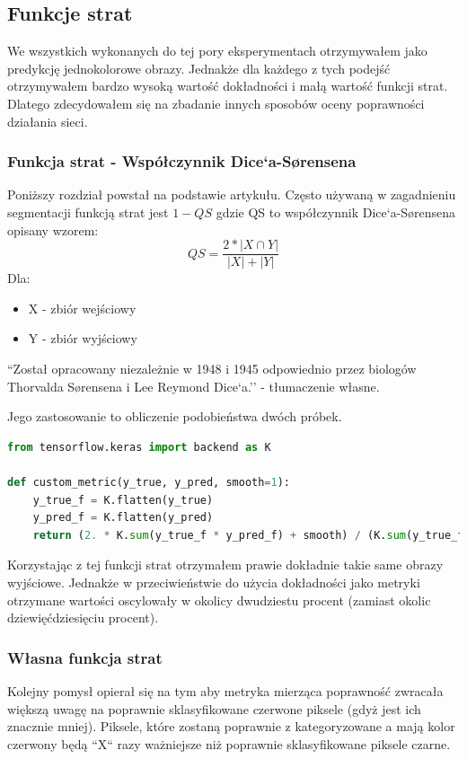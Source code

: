\documentclass{article}
\begin{document}
\subsection{Funkcje strat}
We wszystkich wykonanych do tej pory eksperymentach otrzymywałem jako predykcję jednokolorowe obrazy.
Jednakże dla każdego z tych podejść otrzymywałem bardzo wysoką wartość dokładności i małą wartość funkcji strat.
Dlatego zdecydowałem się na zbadanie innych sposobów oceny poprawności działania sieci.
\subsubsection{Funkcja strat - Współczynnik Dice`a-Sørensena}
Poniższy rozdział powstał na podstawie artykułu\cite{coefficient}.
Często używaną w zagadnieniu segmentacji funkcją strat jest $1-QS$ gdzie QS to współczynnik Dice`a-Sørensena opisany wzorem:
\begin{equation}
    QS = \frac{2*|X \cap Y|}{|X|+|Y|}
\end{equation}
Dla:
\begin{itemize}
    \item X - zbiór wejściowy
    \item Y - zbiór wyjściowy
\end{itemize}

``Został opracowany niezależnie w 1948 i 1945 odpowiednio przez biologów Thorvalda Sørensena i Lee Reymond Dice`a.''\cite{coefficient} - tłumaczenie własne.

Jego zastosowanie to obliczenie podobieństwa dwóch próbek.

\begin{lstlisting}[caption={Implementacja przy użyciu Keras i TensorFlow\cite{diceimpl}},language=python]
from tensorflow.keras import backend as K

def custom_metric(y_true, y_pred, smooth=1):
    y_true_f = K.flatten(y_true)
    y_pred_f = K.flatten(y_pred)
    return (2. * K.sum(y_true_f * y_pred_f) + smooth) / (K.sum(y_true_f) + K.sum(y_pred_f) + smooth)

\end{lstlisting}

Korzystając z tej funkcji strat otrzymałem prawie dokładnie takie same obrazy wyjściowe.
Jednakże w przeciwieństwie do użycia dokładności jako metryki otrzymane wartości oscylowały w okolicy dwudziestu procent (zamiast okolic dziewięćdziesięciu procent).

\subsubsection{Własna funkcja strat}
Kolejny pomysł opierał się na tym aby metryka mierząca poprawność zwracała większą uwagę na poprawnie sklasyfikowane czerwone piksele (gdyż jest ich znacznie mniej).
Piksele, które zostaną poprawnie z kategoryzowane a mają kolor czerwony będą ``X`` razy ważniejsze niż poprawnie sklasyfikowane piksele czarne.
\end{document}
